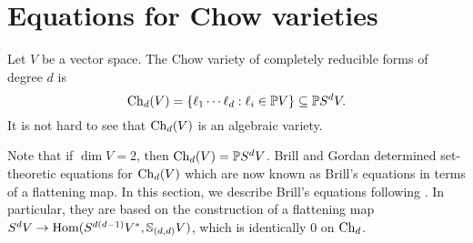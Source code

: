 \section{Equations for Chow varieties}
\label{RepTheory-section-chowvarieties}

Let $V$ be a vector space. The Chow variety of completely reducible forms of degree $d$ is
\[
\mathrm{Ch}_d(V) = \{ \ell_1 \cdots \ell_d : \ell_i \in \mathbb{P} V\} \subseteq \mathbb{P} S^d V.
\]
It is not hard to see that $\mathrm{Ch}_d(V)$ is an algebraic variety. 

Note that if $\dim V = 2$, then $\mathrm{Ch}_d(V) = \mathbb{P} S^d V$. Brill \cite{Bri98} and Gordan \cite{Gor94} determined set-theoretic equations for $\mathrm{Ch}_d(V)$ which are now known as Brill's equations in terms of a flattening map. In this section, we describe Brill's equations following \cite{Lan12,Gua18}. In particular, they are based on the construction of a flattening map $S^d V \to \operatorname{Hom}(S^{d(d-1)} V^*, \mathbb{S}_{(d,d)} V )$, which is identically $0$ on $\mathrm{Ch}_d$. 

